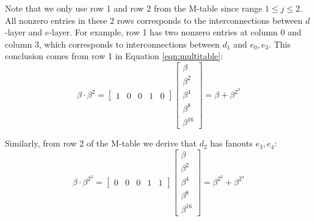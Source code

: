 \begin{Example}
\begin{figure}[bp]
\end{figure}

Note that we only use row 1 and row 2 from the M-table since range $1\leq j \leq 2$.
All nonzero entries in these 2 rows corresponds to the interconnections between $d$-layer and 
$e$-layer. For example, row 1 has two nonzero entries at column 0 and column 3, which corresponds to interconnections 
between $d_1$ and $e_0,e_3$. This conclusion comes from row 1 in Equation \ref{eqn:multitable}:
\begin{equation*}
\beta\cdot\beta^2 = 
\begin{bmatrix}
1 & 0 & 0 & 1 & 0
\end{bmatrix}
\begin{bmatrix}
\beta \\ \beta^2 \\ \beta^4 \\ \beta^8 \\ \beta^{16}
\end{bmatrix}
= \beta + \beta^{2^3}
\end{equation*}

Similarly, from row 2 of the M-table we derive that $d_2$ has fanouts $e_3,e_4$:
\begin{equation*}
\beta\cdot\beta^{2^2} = 
\begin{bmatrix}
0 & 0 & 0 & 1 & 1
\end{bmatrix}
\begin{bmatrix}
\beta \\ \beta^2 \\ \beta^4 \\ \beta^8 \\ \beta^{16}
\end{bmatrix}
= \beta^{2^3} + \beta^{2^4}
\end{equation*}


\end{Example}
